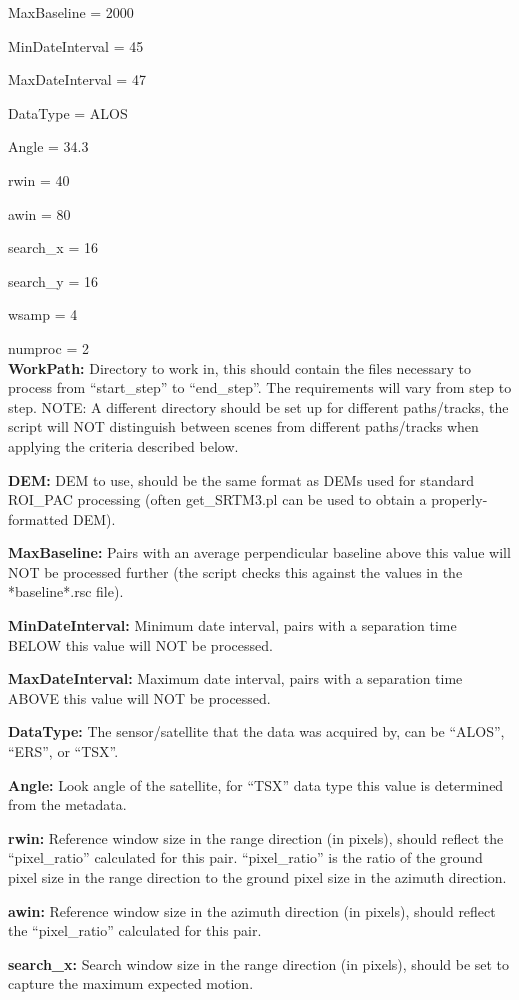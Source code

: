 \documentclass[12pt]{article}
\begin{document}
MaxBaseline	=	2000 

MinDateInterval	=	45

MaxDateInterval	=	47 

DataType	=	ALOS

Angle		=	34.3 

rwin		=	40 

awin		=	80 

search\_x	=	16 

search\_y	=	16 

wsamp		=	4

numproc		=	2 \\


{\bf WorkPath:} Directory to work in, this should contain the files necessary to process from ``start\_step'' to ``end\_step''.
The requirements will vary from step to step.
NOTE: A different directory should be set up for different paths/tracks, the script will NOT distinguish between scenes from different paths/tracks when applying the criteria described below.

{\bf DEM:} DEM to use, should be the same format as DEMs used for standard ROI\_PAC processing (often get\_SRTM3.pl can be used to obtain a properly-formatted DEM).

{\bf MaxBaseline:} Pairs with an average perpendicular baseline above this value will NOT be processed further (the script checks this against the values in the *baseline*.rsc file).

{\bf MinDateInterval:} Minimum date interval, pairs with a separation time BELOW this value will NOT be processed.

{\bf MaxDateInterval:} Maximum date interval, pairs with a separation time ABOVE this value will NOT be processed.

{\bf DataType:} The sensor/satellite that the data was acquired by, can be ``ALOS'', ``ERS'', or ``TSX''.

{\bf Angle:} Look angle of the satellite, for ``TSX'' data type this value is determined from the metadata.

{\bf rwin:} Reference window size in the range direction (in pixels), should reflect the ``pixel\_ratio'' calculated for this pair. 
``pixel\_ratio'' is the ratio of the ground pixel size in the range direction to the ground pixel size in the azimuth direction.

{\bf awin:} Reference window size in the azimuth direction (in pixels), should reflect the ``pixel\_ratio'' calculated for this pair.

{\bf search\_x:} Search window size in the range direction (in pixels), should be set to capture the maximum expected motion.
\end{document}
